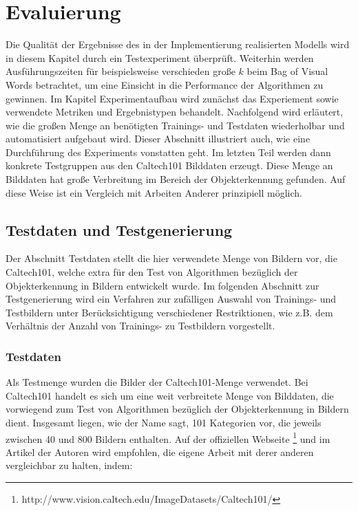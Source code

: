 \chapter{Evaluierung}

Die Qualität der Ergebnisse des in der Implementierung realisierten Modells wird in diesem Kapitel durch ein Testexperiment überprüft. Weiterhin werden Ausführungszeiten für beispielsweise verschieden große $k$ beim Bag of Visual Words betrachtet, um eine Einsicht in die Performance der Algorithmen zu gewinnen.
Im Kapitel Experimentaufbau wird zunächst das Experiement sowie verwendete Metriken und Ergebnistypen behandelt. Nachfolgend wird erläutert, wie die großen Menge an benötigten Trainings- und Testdaten wiederholbar und automatisiert aufgebaut wird. Dieser Abschnitt illustriert auch, wie eine Durchführung des Experiments vonstatten geht. Im letzten Teil werden dann konkrete Testgruppen aus den Caltech101 \cite{cal2004} Bilddaten erzeugt. Diese Menge an Bilddaten hat große Verbreitung im Bereich der Objekterkennung gefunden. Auf diese Weise ist ein Vergleich mit Arbeiten Anderer prinzipiell möglich.

\section{Testdaten und Testgenerierung}

Der Abschnitt Testdaten stellt die hier verwendete Menge von Bildern vor, die Caltech101, welche extra für den Test von Algorithmen bezüglich der Objekterkennung in Bildern entwickelt wurde.\newline
Im folgenden Abschnitt zur Testgenerierung wird ein Verfahren zur zufälligen Auswahl von Trainings- und Testbildern unter Berücksichtigung verschiedener Restriktionen, wie z.B. dem Verhältnis der Anzahl von Trainings- zu Testbildern vorgestellt.

\subsection{Testdaten}

Als Testmenge wurden die Bilder der Caltech101-Menge verwendet. Bei Caltech101 handelt es sich um eine weit verbreitete Menge von Bilddaten, die vorwiegend zum Test von Algorithmen bezüglich der Objekterkennung in Bildern dient. Insgesamt liegen, wie der Name sagt, 101 Kategorien vor, die jeweils zwischen 40 und 800 Bildern enthalten. Auf der offiziellen Webseite \footnote{http://www.vision.caltech.edu/Image\textunderscore Datasets/Caltech101/} und im Artikel der Autoren wird empfohlen, die eigene Arbeit mit derer anderen vergleichbar zu halten, indem:

